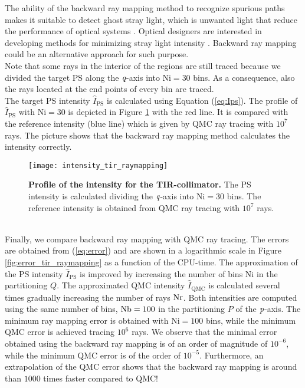 The ability of the backward ray mapping method to recognize spurious paths makes it suitable to detect ghost stray light, which is unwanted light that reduce the performance of optical systems \cite{breault1995control}. Optical designers are interested in developing methods for minimizing stray light intensity \cite{grabarnik2015optical}. Backward ray mapping could be an alternative approach for such purpose. 
\\ \indent Note that some rays in the interior of the regions are still traced because we divided the target PS along the $\textit{q}$-axis into $\textrm{Ni}=30$ bins. As a consequence, also the rays located at the end points of every bin are traced. \\
\indent The target PS intensity $\hat{I}_{\textrm{PS}}$ is calculated using Equation (\ref{eq:Ips}). The profile of $\hat{I}_{\textrm{PS}}$ with $\textrm{Ni}=30$ is depicted in Figure \ref{fig:intensity_tir_raymapping} with the red line. It is compared with the reference intensity (blue line) which is given by QMC ray tracing with $10^7$ rays. The picture shows that the backward ray mapping method calculates the intensity correctly.
\begin{figure}[t]
  \begin{center}
  \texttt{[image: intensity\_tir\_raymapping]}
  \end{center}
  \caption{\textbf{Profile of the intensity for the TIR-collimator.}
 The PS intensity is calculated dividing the $\textit{q}$-axis into $\textrm{Ni}=30$ bins. The reference intensity is obtained from QMC ray tracing with $10^7$ rays.}
\label{fig:intensity_tir_raymapping}
 \end{figure}
\\ \indent 
Finally, we compare backward ray mapping with QMC ray tracing. The errors are obtained from (\ref{eq:error}) and are shown in a logarithmic scale in Figure \ref{fig:error_tir_raymapping} as a function of the CPU-time. The approximation of the PS intensity $\hat{I}_{\textrm{PS}}$ is improved by increasing the number of bins $\textrm{Ni}$ in the partitioning $Q$. The approximated QMC intensity $\hat{I}_{\textrm{QMC}}$ is calculated several times gradually increasing the number of rays $\textrm{Nr}$. Both intensities are computed using the same number of bins, $\textrm{Nb}=100$ in the partitioning $P$ of the $\textit{p}$-axis. The minimum ray mapping error is obtained with $\textrm{Ni}=100$ bins, while the minimum QMC error is achieved tracing $10^6$ rays. We observe that the minimal error obtained using the backward ray mapping is of an order of magnitude of $10^{-6}$, while the minimum QMC error is of the order of $10^{-5}$. Furthermore, an extrapolation of the QMC error shows that the backward ray mapping is around than $1000$ times faster compared to QMC!
